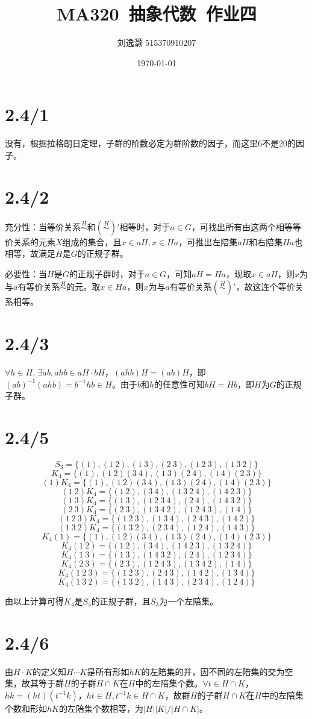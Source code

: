 \documentclass{article}
\title{MA320\ 抽象代数\ 作业四}
\author{刘逸灏 515370910207}
\date{\today}
\begin{document}
\maketitle

\section{2.4/1}
没有，根据拉格朗日定理，子群的阶数必定为群阶数的因子，而这里6不是20的因子。

\section{2.4/2}
充分性：当等价关系$\mathop{\sim}\limits^H$和$(\mathop{\sim}\limits^H)'$相等时，对于$a\in G$，可找出所有由这两个相等等价关系的元素$X$组成的集合，且$x\in aH,x\in Ha$，可推出左陪集$aH$和右陪集$Ha$也相等，故满足$H$是$G$的正规子群。

必要性：当$H$是$G$的正规子群时，对于$a\in G$，可知$aH=Ha$，现取$x\in aH$，则$x$为与$a$有等价关系$\mathop{\sim}\limits^H$的元。取$x\in Ha$，则$x$为与$a$有等价关系$(\mathop{\sim}\limits^H)'$，故这连个等价关系相等。

\section{2.4/3}
$\forall h\in H$, $\exists ab,ahb\in aH\cdot bH$，$(ahb)H=(ab)H$，即$(ab)^{-1}(ahb)=b^{-1}hb\in H$。由于$b$和$h$的任意性可知$bH=Hb$，即$H$为$G$的正规子群。

\section{2.4/5}
$$S_3=\{(1),(1\ 2),(1\ 3),(2\ 3),(1\ 2\ 3),(1\ 3\ 2)\}$$
$$K_4=\{(1),(1\ 2)(3\ 4),(1\ 3)(2\ 4),(1\ 4)(2\ 3)\}$$
$$(1)K_4=\{(1),(1\ 2)(3\ 4),(1\ 3)(2\ 4),(1\ 4)(2\ 3)\}$$
$$(1\ 2)K_4=\{(1\ 2),(3\ 4),(1\ 3\ 2\ 4),(1\ 4\ 2\ 3)\}$$
$$(1\ 3)K_4=\{(1\ 3),(1\ 2\ 3\ 4),(2\ 4),(1\ 4\ 3\ 2)\}$$
$$(2\ 3)K_4=\{(2\ 3),(1\ 3\ 4\ 2),(1\ 2\ 4\ 3),(1\ 4)\}$$
$$(1\ 2\ 3)K_4=\{(1\ 2\ 3),(1\ 3\ 4),(2\ 4\ 3),(1\ 4\ 2)\}$$
$$(1\ 3\ 2)K_4=\{(1\ 3\ 2),(2\ 3\ 4),(1\ 2\ 4),(1\ 4\ 3)\}$$
$$K_4(1)=\{(1),(1\ 2)(3\ 4),(1\ 3)(2\ 4),(1\ 4)(2\ 3)\}$$
$$K_4(1\ 2)=\{(1\ 2),(3\ 4),(1\ 4\ 2\ 3),(1\ 3\ 2\ 4)\}$$
$$K_4(1\ 3)=\{(1\ 3),(1\ 4\ 3\ 2),(2\ 4),(1\ 2\ 3\ 4)\}$$
$$K_4(2\ 3)=\{(2\ 3),(1\ 2\ 4\ 3),(1\ 3\ 4\ 2),(1\ 4)\}$$
$$K_4(1\ 2\ 3)=\{(1\ 2\ 3),(2\ 4\ 3),(1\ 4\ 2),(1\ 3\ 4)\}$$
$$K_4(1\ 3\ 2)=\{(1\ 3\ 2),(1\ 4\ 3),(2\ 3\ 4),(1\ 2\ 4)\}$$

由以上计算可得$K_4$是$S_4$的正规子群，且$S_3$为一个左陪集。

\section{2.4/6}
由$H\cdot K$的定义知$H\cdots K$是所有形如$hK$的左陪集的并，因不同的左陪集的交为空集，故其等于群$H$的子群$H\cap K$在$H$中的左陪集个数。$\forall t\in H\cap K$，$hk=(ht)(t^{-1}k)$，$ht\in H, t^{-1}k\in H\cap K$，故群$H$的子群$H\cap K$在$H$中的左陪集个数和形如$hK$的左陪集个数相等，为$|H||K|/|H\cap K|$。
\end{document}
